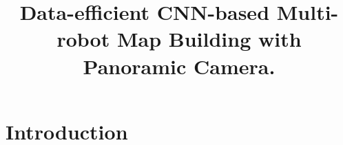 \documentclass[letterpaper, 10 pt, conference]{ieeeconf}  %
\title{\LARGE \bf
Data-efficient CNN-based Multi-robot Map Building with Panoramic Camera.
}
\begin{document}
\maketitle
\thispagestyle{empty}
\pagestyle{empty}


\begin{abstract}

\end{abstract}

\section{Introduction}




\end{document}
